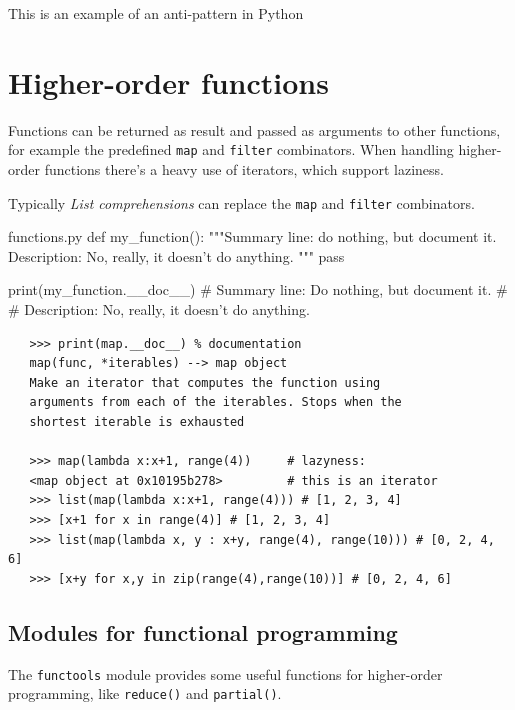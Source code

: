 This is an example of an anti-pattern in Python

\section{Higher-order functions}
Functions can be returned as result and passed as arguments to other functions, for example the predefined \lstinline|map| and \lstinline|filter| combinators.
When handling higher-order functions there's a heavy use of iterators, which support laziness.

Typically \textit{List comprehensions} can replace the \lstinline|map| and \lstinline|filter| combinators.

\begin{filecontents*}{functions.py}
   def my_function():
      """Summary line: do nothing, but document it.
      Description: No, really, it doesn't do anything.
      """
      pass

   print(my_function.__doc__)
   # Summary line: Do nothing, but document it.
   #
   # Description: No, really, it doesn't do anything.
\end{filecontents*}

\begin{lstlisting}
   >>> print(map.__doc__) % documentation
   map(func, *iterables) --> map object
   Make an iterator that computes the function using
   arguments from each of the iterables. Stops when the
   shortest iterable is exhausted

   >>> map(lambda x:x+1, range(4))     # lazyness: 
   <map object at 0x10195b278>         # this is an iterator
   >>> list(map(lambda x:x+1, range(4))) # [1, 2, 3, 4]
   >>> [x+1 for x in range(4)] # [1, 2, 3, 4]
   >>> list(map(lambda x, y : x+y, range(4), range(10))) # [0, 2, 4, 6]
   >>> [x+y for x,y in zip(range(4),range(10))] # [0, 2, 4, 6]
\end{lstlisting}

\subsection{Modules for functional programming}
The \texttt{functools} module provides some useful functions for higher-order programming, like \texttt{reduce()} and \texttt{partial()}.

